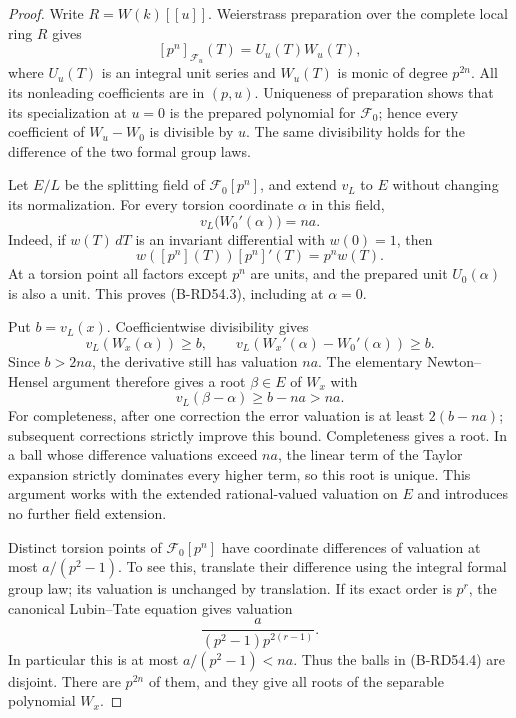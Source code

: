 \begin{proof}
Write $R=W(k)[[u]]$. Weierstrass preparation over the complete
local ring $R$ gives
\[
                  [p^n]_{\mathcal F_u}(T)=U_u(T)W_u(T),
\]
where $U_u(T)$ is an integral unit series and $W_u(T)$ is monic
of degree $p^{2n}$. All its nonleading coefficients are in
$(p,u)$. Uniqueness of preparation shows that its specialization
at $u=0$ is the prepared polynomial for $\mathcal F_0$; hence
every coefficient of $W_u-W_0$ is divisible by $u$.
The same divisibility holds for the difference of the two formal
group laws.

Let $E/L$ be the splitting field of $\mathcal F_0[p^n]$, and
extend $v_L$ to $E$ without changing its normalization. For
every torsion coordinate $\alpha$ in this field,
\[
                       v_L\bigl(W_0'(\alpha)\bigr)=na.
                                                        \tag{B-RD54.3}
\]
Indeed, if $w(T)\,dT$ is an invariant differential with $w(0)=1$,
then
\[
 w([p^n](T))[p^n]'(T)=p^n w(T).
\]
At a torsion point all factors except $p^n$ are units, and the
prepared unit $U_0(\alpha)$ is also a unit. This proves
(B-RD54.3), including at $\alpha=0$.

Put $b=v_L(x)$. Coefficientwise divisibility gives
\[
 v_L(W_x(\alpha))\ge b,
 \qquad v_L(W_x'(\alpha)-W_0'(\alpha))\ge b.
\]
Since $b>2na$, the derivative still has valuation $na$.
The elementary Newton--Hensel argument therefore gives a root
$\beta\in E$ of $W_x$ with
\[
                       v_L(\beta-\alpha)\ge b-na>na.
                                                        \tag{B-RD54.4}
\]
For completeness, after one correction the error valuation
is at least $2(b-na)$; subsequent corrections strictly improve
this bound. Completeness gives a root. In a ball whose difference
valuations exceed $na$, the linear term of the Taylor expansion
strictly dominates every higher term, so this root is unique.
This argument works with the extended rational-valued valuation
on $E$ and introduces no further field extension.

Distinct torsion points of $\mathcal F_0[p^n]$ have coordinate
differences of valuation at most $a/(p^2-1)$. To see this,
translate their difference using the integral formal group law;
its valuation is unchanged by translation. If its exact order
is $p^r$, the canonical Lubin--Tate equation gives valuation
\[
                      \frac{a}{(p^2-1)p^{2(r-1)}}.
\]
In particular this is at most $a/(p^2-1)<na$.
Thus the balls in (B-RD54.4) are disjoint. There are $p^{2n}$
of them, and they give all roots of the separable polynomial
$W_x$.


\end{proof}
